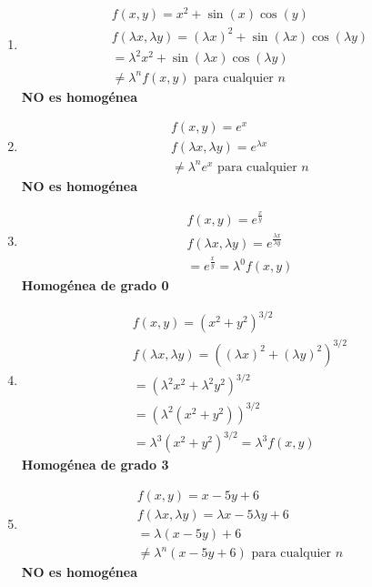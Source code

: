 \documentclass[a4paper,12pt]{article}
\begin{document}
\begin{enumerate}
    \item 
    \[
    \begin{array}{l}
    f(x,y) = x^{2} + \sin(x)\cos(y) \\[1.2em]
    f(\lambda x, \lambda y) = (\lambda x)^{2} + \sin(\lambda x)\cos(\lambda y) \\[1.2em]
    = \lambda^{2} x^{2} + \sin(\lambda x)\cos(\lambda y) \\[1.2em]
    \neq \lambda^{n} f(x,y) \text{ para cualquier } n
    \end{array}
    \]
    \textbf{NO es homogénea}

    \item 
    \[
    \begin{array}{l}
    f(x,y) = e^{x} \\[1.2em]
    f(\lambda x, \lambda y) = e^{\lambda x} \\[1.2em]
    \neq \lambda^{n} e^{x} \text{ para cualquier } n
    \end{array}
    \]
    \textbf{NO es homogénea}

    \item 
    \[
    \begin{array}{l}
    f(x,y) = e^{\frac{x}{y}} \\[1.2em]
    f(\lambda x, \lambda y) = e^{\frac{\lambda x}{\lambda y}} \\[1.2em]
    = e^{\frac{x}{y}} = \lambda^{0} f(x,y)
    \end{array}
    \]
    \textbf{Homogénea de grado 0}

    \item 
    \[
    \begin{array}{l}
    f(x,y) = \left( x^{2} + y^{2}\right)^{3/2} \\[1.2em]
    f(\lambda x, \lambda y) = \left( (\lambda x)^{2} + (\lambda y)^{2}\right)^{3/2} \\[1.2em]
    = \left( \lambda^{2} x^{2} + \lambda^{2} y^{2}\right)^{3/2} \\[1.2em]
    = \left( \lambda^{2}(x^{2} + y^{2})\right)^{3/2} \\[1.2em]
    = \lambda^{3}\left( x^{2} + y^{2}\right)^{3/2} = \lambda^{3} f(x,y)
    \end{array}
    \]
    \textbf{Homogénea de grado 3}

    \item 
    \[
    \begin{array}{l}
    f(x,y) = x - 5y + 6 \\[1.2em]
    f(\lambda x, \lambda y) = \lambda x - 5\lambda y + 6 \\[1.2em]
    = \lambda(x - 5y) + 6 \\[1.2em]
    \neq \lambda^{n}(x - 5y + 6) \text{ para cualquier } n
    \end{array}
    \]
    \textbf{NO es homogénea}


\end{enumerate}
\end{document}
